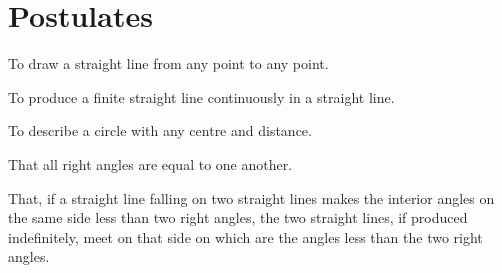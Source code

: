%

\section*{Postulates}
\label{sec:postulates}

\begin{rrxivremark}[Postulate~1]
\label{post:1}
To draw a straight line from any point to any point.
\end{rrxivremark}

\begin{rrxivremark}[Postulate~2]
\label{post:2}
To produce a finite straight line continuously in a straight line.
\end{rrxivremark}

\begin{rrxivremark}[Postulate~3]
\label{post:3}
To describe a circle with any centre and distance.
\end{rrxivremark}

\begin{rrxivremark}[Postulate~4]
\label{post:4}
That all right angles are equal to one another.
\end{rrxivremark}

\begin{rrxivremark}
\label{post:5}
That, if a straight line falling on two straight lines makes the
interior angles on the same side less than two right angles, the two
straight lines, if produced indefinitely, meet on that side on which
are the angles less than the two right angles.
\end{rrxivremark}
